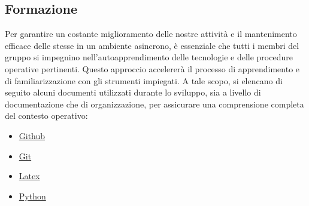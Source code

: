 \documentclass{article}
\begin{document}
\subsection{Formazione}
Per garantire un costante miglioramento delle nostre attività e il mantenimento efficace delle stesse in un ambiente asincrono, è essenziale che tutti i membri del gruppo si impegnino nell'autoapprendimento delle tecnologie e delle procedure operative pertinenti. Questo approccio accelererà il processo di apprendimento e di familiarizzazione con gli strumenti impiegati. A tale scopo, si elencano di seguito alcuni documenti utilizzati durante lo sviluppo, sia a livello di documentazione che di organizzazione, per assicurare una comprensione completa del contesto operativo:

\begin{itemize} 
    \item \href{https://docs.github.com/en}{Github}
    \item \href{https://docs.github.com/en/get-started/using-git/pushing-commits-to-a-remote-repository}{Git}
    \item \href{https://www.overleaf.com/learn/latex/Learn_LaTeX_in_30_minutes}{Latex}
    \item \href{https://docs.python.org/3/tutorial/index.html}{Python}
\end{itemize}
\end{document}
